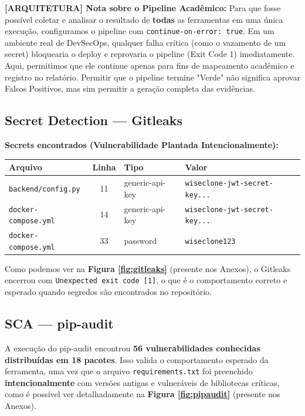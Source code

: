 \documentclass[12pt,a4paper]{article}
\begin{document}
\begin{mdframed}[backgroundcolor=gray!10]
\textbf{[ARQUITETURA] Nota sobre o Pipeline Acadêmico:} Para que fosse possível coletar e analisar o resultado de \textbf{todas} as ferramentas em uma única execução, configuramos o pipeline com \texttt{continue-on-error: true}. Em um ambiente real de DevSecOps, qualquer falha crítica (como o vazamento de um secret) bloquearia o deploy e reprovaria o pipeline (Exit Code 1) imediatamente. Aqui, permitimos que ele continue apenas para fins de mapeamento acadêmico e registro no relatório. Permitir que o pipeline termine "Verde" não significa aprovar Falsos Positivos, mas sim permitir a geração completa das evidências.
\end{mdframed}

\subsection{Secret Detection — Gitleaks}
\textbf{Secrets encontrados (Vulnerabilidade Plantada Intencionalmente):}

\begin{table}[h]
\centering
\begin{tabular}{|l|c|l|l|}
\hline
\textbf{Arquivo} & \textbf{Linha} & \textbf{Tipo} & \textbf{Valor} \\ \hline
\texttt{backend/config.py} & 11 & generic-api-key & \texttt{wiseclone-jwt-secret-key...} \\ \hline
\texttt{docker-compose.yml} & 14 & generic-api-key & \texttt{wiseclone-jwt-secret-key...} \\ \hline
\texttt{docker-compose.yml} & 33 & password & \texttt{wiseclone123} \\ \hline
\end{tabular}
\end{table}

Como podemos ver na \textbf{Figura \ref{fig:gitleaks}} (presente nos Anexos), o Gitleaks encerrou com \texttt{Unexpected exit code [1]}, o que é o comportamento correto e esperado quando segredos são encontrados no repositório.

\subsection{SCA — pip-audit}
A execução do pip-audit encontrou \textbf{56 vulnerabilidades conhecidas distribuídas em 18 pacotes}. Isso valida o comportamento esperado da ferramenta, uma vez que o arquivo \texttt{requirements.txt} foi preenchido \textbf{intencionalmente} com versões antigas e vulneráveis de bibliotecas críticas, como é possível ver detalhadamente na \textbf{Figura \ref{fig:pipaudit}} (presente nos Anexos).
\end{document}
